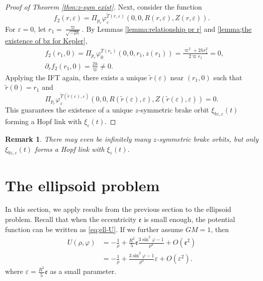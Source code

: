 \documentclass[11pt]{amsart}
\newcommand{\ep}{\varepsilon}
\newcommand{\om}{\varpi}
\newcommand{\fe}{\mathfrak{e}}
\newtheorem{remark}{Remark}[section]
\begin{document}
\begin{proof}[Proof of Theorem \ref{thm:z-sym exist}]
Next, consider the function  
$$
f_2(r, \ep) = \Pi_{p_r}\varphi_\ep^{\tilde{T}(r, \ep)}( 0, 0, R(r, \ep), Z(r, \ep)).
$$  
For $\ep = 0$, let $r_1 = \frac{\om}{\sqrt{-2h}}$. By Lemmas \ref{lemma:relationship pr r} and \ref{lemma;the existence of bz for Kepler},  
$$
\begin{aligned}
	&f_2(r_1, 0) = \Pi_{p_r}\varphi_0^{T(r_1)}( 0, 0, r_1, z(r_1)) = \frac{\om^2 + 2hr_1^2}{2\om r_1} = 0,\\
	&\partial_r f_2(r_1, 0) = \frac{2h}{\om} \neq 0.
\end{aligned}
$$
Applying the IFT again, there exists a unique $\tilde{r}(\ep)$ near $(r_1,0)$ such that $\tilde{r}(0) = r_1$ and  
\[
\Pi_{p_r}\varphi_\ep^{\tilde{T}(\tilde{r}(\ep),\ep)}( 0, 0, R(\tilde{r}(\ep), \ep), Z(\tilde{r}(\ep), \ep)) = 0.
\]  
This guarantees the existence of a unique $z$-symmetric brake orbit $\xi_{bz, \ep}(t)$ forming a Hopf link with $\xi_{\ep}(t)$.
\end{proof}
\begin{remark}
	There may even be infinitely many $z$-symmetric brake orbits, but only $\xi_{bz, \ep}(t)$ forms a Hopf link with $\xi_{\ep}(t)$.
\end{remark}

\section{The ellipsoid problem}\label{sec:ellipsoid}
In this section, we apply results from the previous section to the ellipsoid problem. Recall that when the eccentricity $\fe$ is small enough, the potential function can be written as \eqref{eq;ell-U}. If we further assume $GM=1$, then 
\begin{equation}
	\begin{aligned}			  
		U(\rho,\varphi) &=-\frac{1}{\rho}+\frac{R^{2}}{5}\fe\frac{3\sin^{2}\varphi-1}{\rho^{3}}+O(\fe^{2})\\
		&=-\frac{1}{\rho}+\frac{3\sin^{2}\varphi-1}{\rho^{3}}\ep+O(\ep^{2}).
	\end{aligned}
\end{equation}
where $\ep=\frac{R^{2}}{5}\fe$ as a small parameter.

\end{document}

